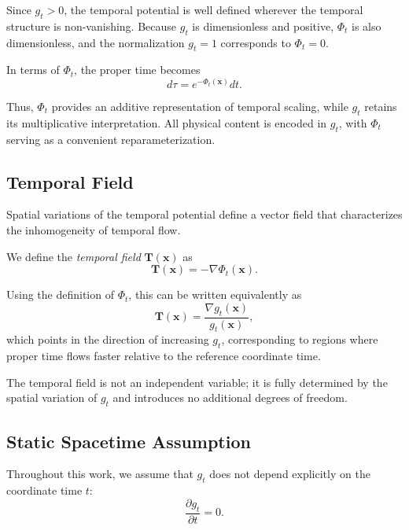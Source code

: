 \documentclass[12pt]{article}
\begin{document}
Since $g_t > 0$, the temporal potential is well defined wherever the temporal structure is non-vanishing. Because $g_t$ is dimensionless and positive, $\Phi_t$ is also dimensionless, and the normalization $g_t = 1$ corresponds to $\Phi_t = 0$.

In terms of $\Phi_t$, the proper time becomes
\begin{equation}
d\tau = e^{-\Phi_t(\mathbf{x})} dt .
\end{equation}

Thus, $\Phi_t$ provides an additive representation of temporal scaling, while $g_t$ retains its multiplicative interpretation. All physical content is encoded in $g_t$, with $\Phi_t$ serving as a convenient reparameterization.

\subsection{Temporal Field}
\label{sec:T}

Spatial variations of the temporal potential define a vector field that characterizes the inhomogeneity of temporal flow.

We define the \emph{temporal field} $\mathbf{T}(\mathbf{x})$ as
\begin{equation}
\mathbf{T}(\mathbf{x}) = - \nabla \Phi_t(\mathbf{x}) .
\label{eq:temporal_field}
\end{equation}

Using the definition of $\Phi_t$, this can be written equivalently as
\begin{equation}
\mathbf{T}(\mathbf{x}) = \frac{\nabla g_t(\mathbf{x})}{g_t(\mathbf{x})} ,
\label{eq:temporal_field_gt}
\end{equation}
which points in the direction of increasing $g_t$, corresponding to regions where proper time flows faster relative to the reference coordinate time.

The temporal field is not an independent variable; it is fully determined by the spatial variation of $g_t$ and introduces no additional degrees of freedom.

\subsection{Static Spacetime Assumption}
\label{sec:static}

Throughout this work, we assume that $g_t$ does not depend explicitly on the coordinate time $t$:
$$
\frac{\partial g_t}{\partial t} = 0 .
$$
\end{document}

